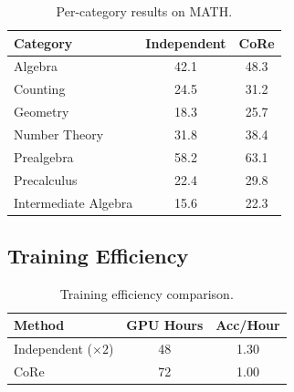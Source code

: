 \documentclass[11pt]{article}
\newcommand{\methodname}{CoRe}
\begin{document}
\begin{table}[h]
    \centering
    \small
    \begin{tabular}{lcc}
        \toprule
        \textbf{Category} & \textbf{Independent} & \textbf{\methodname{}} \\
        \midrule
        Algebra & 42.1 & 48.3 \\
        Counting & 24.5 & 31.2 \\
        Geometry & 18.3 & 25.7 \\
        Number Theory & 31.8 & 38.4 \\
        Prealgebra & 58.2 & 63.1 \\
        Precalculus & 22.4 & 29.8 \\
        Intermediate Algebra & 15.6 & 22.3 \\
        \bottomrule
    \end{tabular}
    \caption{Per-category results on MATH.}
    \label{tab:math_categories}
\end{table}

\subsection{Training Efficiency}

\begin{table}[h]
    \centering
    \small
    \begin{tabular}{lcc}
        \toprule
        \textbf{Method} & \textbf{GPU Hours} & \textbf{Acc/Hour} \\
        \midrule
        Independent ($\times 2$) & 48 & 1.30 \\
        \methodname{} & 72 & 1.00 \\
        \bottomrule
    \end{tabular}
    \caption{Training efficiency comparison.}
    \label{tab:efficiency}
\end{table}
\end{document}
